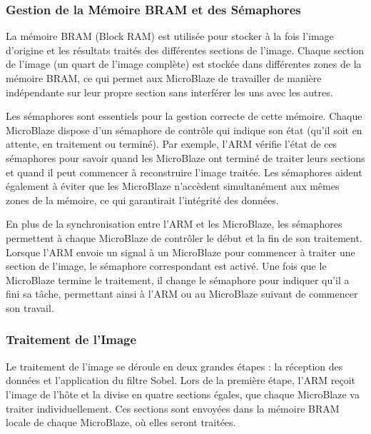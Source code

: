 \documentclass[../CSC_5RO07_TA.tex]{subfiles}
\begin{document}
\subsubsection{Gestion de la Mémoire BRAM et des Sémaphores}
La mémoire BRAM (Block RAM) est utilisée pour stocker à la fois l'image d'origine et les résultats traités des différentes sections de l'image. Chaque section de l'image (un quart de l'image complète) est stockée dans différentes zones de la mémoire BRAM, ce qui permet aux MicroBlaze de travailler de manière indépendante sur leur propre section sans interférer les uns avec les autres.

\vspace{1em} 

Les sémaphores sont essentiels pour la gestion correcte de cette mémoire. Chaque MicroBlaze dispose d'un sémaphore de contrôle qui indique son état (qu'il soit en attente, en traitement ou terminé). Par exemple, l'ARM vérifie l'état de ces sémaphores pour savoir quand les MicroBlaze ont terminé de traiter leurs sections et quand il peut commencer à reconstruire l'image traitée. Les sémaphores aident également à éviter que les MicroBlaze n'accèdent simultanément aux mêmes zones de la mémoire, ce qui garantirait l'intégrité des données.

\vspace{1em} 

En plus de la synchronisation entre l'ARM et les MicroBlaze, les sémaphores permettent à chaque MicroBlaze de contrôler le début et la fin de son traitement. Lorsque l'ARM envoie un signal à un MicroBlaze pour commencer à traiter une section de l'image, le sémaphore correspondant est activé. Une fois que le MicroBlaze termine le traitement, il change le sémaphore pour indiquer qu'il a fini sa tâche, permettant ainsi à l'ARM ou au MicroBlaze suivant de commencer son travail.

\vspace{1em} 

\subsubsection{Traitement de l'Image}
Le traitement de l'image se déroule en deux grandes étapes : la réception des données et l'application du filtre Sobel. Lors de la première étape, l'ARM reçoit l'image de l'hôte et la divise en quatre sections égales, que chaque MicroBlaze va traiter individuellement. Ces sections sont envoyées dans la mémoire BRAM locale de chaque MicroBlaze, où elles seront traitées.
\end{document}
